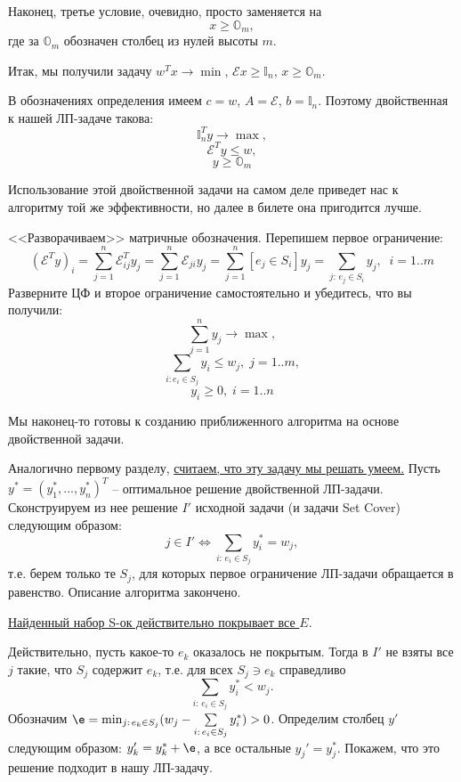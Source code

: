 Наконец, третье условие, очевидно, просто заменяется на $$x \geq \mathbb{O}_m,$$ где за $\mathbb{O}_m$ обозначен столбец из нулей высоты $m$.

Итак, мы получили задачу $w^Tx \rightarrow \min$, $\mathcal{E} x \geq \mathbb{I}_n$, $x \geq \mathbb{O}_m$. 


В обозначениях определения имеем $c = w$, $A = \mathcal E$, $b = \mathbb{I}_n$. Поэтому двойственная к нашей ЛП-задаче такова: 
$$\mathbb{I}_n^Ty \rightarrow \max,$$
$$\mathcal{E}^T y \leq w,$$
$$y \geq \mathbb{O}_m$$

Использование этой двойственной задачи на самом деле приведет нас к алгоритму той же эффективности, но далее в билете она пригодится лучше. 

<<Разворачиваем>> матричные обозначения. Перепишем первое ограничение:
$$(\mathcal{E}^Ty)_i = \sum^n_{j=1}\mathcal{E}^T_{ij}y_j = \sum^n_{j=1}\mathcal{E}_{ji}y_j = \sum^n_{j=1} [e_j \in S_i] y_j = \sum_{j:\, e_j \in S_i} y_j, \;\; i=1..m$$
Разверните ЦФ и второе ограничение самостоятельно и убедитесь, что вы получили:
$$\sum^n_{j=1} y_j \rightarrow\max,$$
$$\sum_{i: e_i \in S_j} y_i\leq w_j, \; j=1..m,$$
$$y_i \geq 0, \; i=1..n$$

Мы наконец-то готовы к созданию приближенного алгоритма на основе двойственной задачи. 


Аналогично первому разделу, \underline{считаем, что эту задачу мы решать умеем.} Пусть $y^* = (y_1^*, ..., y_n^*)^T$ -- оптимальное решение двойственной ЛП-задачи. Сконструируем из нее решение $I'$ исходной задачи (и задачи Set Cover) следующим образом:
$$j \in I' \iff \sum_{i:\, e_i \in S_j}y_i^* = w_j,$$
т.е. берем только те $S_j$, для которых первое ограничение ЛП-задачи обращается в равенство.
Описание алгоритма закончено.

\underline{Найденный набор S-ок действительно покрывает все $E$}.

Действительно, пусть какое-то $e_k$ оказалось не покрытым. Тогда в $I'$ не взяты все $j$ такие, что $S_j$ содержит $e_k$, т.е. для всех $S_j \ni e_k$ справедливо $$\sum_{i:\, e_i \in S_j}y_i^* < w_j.$$ 
Обозначим $\e = \min_{j:\, e_k \in S_j} (w_j - \sum\limits_{i:\, e_i \in S_j}y_i^*) > 0$. Определим столбец $y'$ следующим образом: $y_k' = y_k^* + \e$, а все остальные $y_j' = y_j^*$. Покажем, что это решение подходит в нашу ЛП-задачу. 

